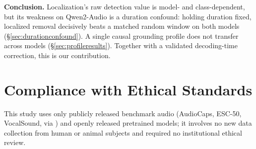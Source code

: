 \documentclass{article}
\begin{document}
\textbf{Conclusion.} Localization's raw detection value is model- and
class-dependent, but its weakness on Qwen2-Audio is a duration
confound: holding duration fixed, localized removal decisively beats a
matched random window on both models (\S\ref{sec:durationconfound}).
A single causal grounding profile does not transfer across models
(\S\ref{sec:profileresults}). Together with a validated decoding-time
correction, this is our contribution.

\section*{Compliance with Ethical Standards}
This study uses only publicly released benchmark audio (AudioCaps,
ESC-50, VocalSound, via \cite{kuan2025can}) and openly released
pretrained models; it involves no new data collection from human or
animal subjects and required no institutional ethical review.

{\scriptsize


}
\end{document}
